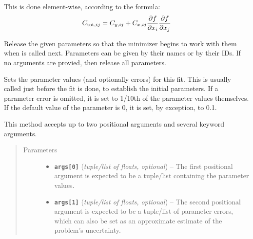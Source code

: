 \documentclass[a4paper,10pt,english]{sphinxmanual}
\begin{document}
\begin{fulllineitems}
\begin{fulllineitems}
This is done element-wise, according to the formula:
\begin{gather}
\begin{split}C_{\text{tot}, ij} = C_{y, ij} + C_{x, ij}
\frac{\partial f}{\partial x_i}  \frac{\partial f}{\partial x_j}\end{split}\notag
\end{gather}
\end{fulllineitems}


\begin{fulllineitems}
\label{index:kafe.fit.Fit.release_parameters}
Release the given parameters so that the minimizer begins to work with
them when  is called next. Parameters can be given by
their
names or by their IDs. If no arguments are provied, then release all
parameters.

\end{fulllineitems}


\begin{fulllineitems}
\label{index:kafe.fit.Fit.set_parameters}
Sets the parameter values (and optionally errors) for this fit.
This is usually called just before the fit is done, to establish
the initial parameters. If a parameter error is omitted, it is
set to 1/10th of the parameter values themselves. If the default
value of the parameter is 0, it is set, by exception, to 0.1.

This method accepts up to two positional arguments and several
keyword arguments.
\begin{quote}\begin{description}
\item[{Parameters}] \leavevmode\begin{itemize}
\item {} 
\textbf{\texttt{args{[}0{]}}} (\emph{tuple/list of floats, optional}) -- The first positional argument is expected to be
a tuple/list containing the parameter values.

\item {} 
\textbf{\texttt{args{[}1{]}}} (\emph{tuple/list of floats, optional}) -- The second positional argument is expected to be a
tuple/list of parameter errors, which can also be set as an
approximate estimate of the problem's uncertainty.


\end{itemize}
\end{description}
\end{quote}
\end{fulllineitems}
\end{fulllineitems}
\end{document}
